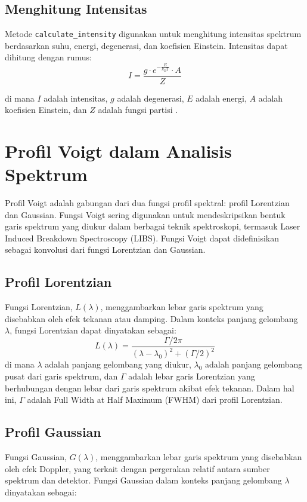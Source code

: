 \subsection{Menghitung Intensitas}
\par Metode \texttt{calculate\_intensity} digunakan untuk menghitung intensitas spektrum berdasarkan suhu, energi, degenerasi, dan koefisien Einstein. Intensitas dapat dihitung dengan rumus:
\begin{equation}
I = \frac{g \cdot e^{-\frac{E}{k_B T}} \cdot A}{Z}
\end{equation}

di mana $I$ adalah intensitas, $g$ adalah degenerasi, $E$ adalah energi, $A$ adalah koefisien Einstein, dan $Z$ adalah fungsi partisi \citep{mason2015}.


\section{Profil Voigt dalam Analisis Spektrum}
\par Profil Voigt adalah gabungan dari dua fungsi profil spektral: profil Lorentzian dan Gaussian. Fungsi Voigt sering digunakan untuk mendeskripsikan bentuk garis spektrum yang diukur dalam berbagai teknik spektroskopi, termasuk Laser Induced Breakdown Spectroscopy (LIBS). Fungsi Voigt dapat didefinisikan sebagai konvolusi dari fungsi Lorentzian dan Gaussian.

\subsection{Profil Lorentzian}
\par Fungsi Lorentzian, \( L(\lambda) \), menggambarkan lebar garis spektrum yang disebabkan oleh efek tekanan atau damping. Dalam konteks panjang gelombang \( \lambda \), fungsi Lorentzian dapat dinyatakan sebagai:
\begin{equation}
L(\lambda) = \frac{\Gamma / 2\pi}{(\lambda - \lambda_0)^2 + (\Gamma / 2)^2}
\end{equation}
di mana \( \lambda \) adalah panjang gelombang yang diukur, \( \lambda_0 \) adalah panjang gelombang pusat dari garis spektrum, dan \( \Gamma \) adalah lebar garis Lorentzian yang berhubungan dengan lebar dari garis spektrum akibat efek tekanan. Dalam hal ini, \( \Gamma \) adalah Full Width at Half Maximum (FWHM) dari profil Lorentzian.

\subsection{Profil Gaussian}
\par Fungsi Gaussian, \( G(\lambda) \), menggambarkan lebar garis spektrum yang disebabkan oleh efek Doppler, yang terkait dengan pergerakan relatif antara sumber spektrum dan detektor. Fungsi Gaussian dalam konteks panjang gelombang \( \lambda \) dinyatakan sebagai:

